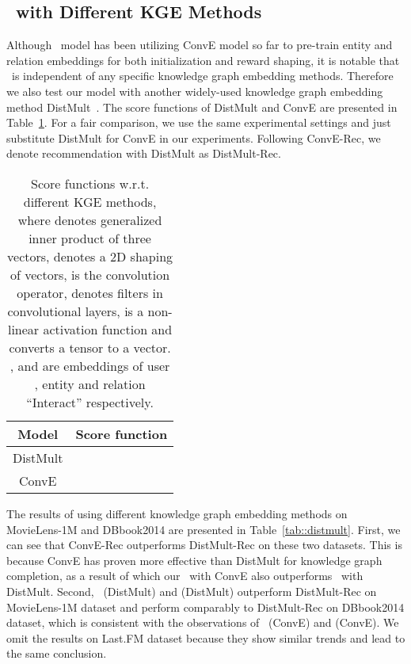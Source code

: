 \subsection{\name\ with Different KGE Methods}\label{sec::distmult}
Although \name\ model has been utilizing ConvE model so far to pre-train entity and relation embeddings for both initialization and reward shaping, it is notable that \name\ is independent of any specific knowledge graph embedding methods. 
Therefore we also test our model with another widely-used knowledge graph embedding method DistMult~\cite{yang2014embedding}. The score functions of DistMult and ConvE are presented in Table~\ref{tab::score_func}. For a fair comparison, we use the same experimental settings and just substitute DistMult for ConvE in our experiments. Following ConvE-Rec, we denote recommendation with DistMult as DistMult-Rec.



\begin{table}[t]
    \centering
    \begin{tabular}{cc}
    \toprule
        Model & Score function   \\
        \midrule
        DistMult &  \\
        ConvE &  \\
    \bottomrule
    \end{tabular}
    \caption{Score functions w.r.t. different KGE methods, where  denotes generalized inner product of three vectors,  denotes a 2D shaping of vectors,  is the convolution operator,  denotes filters in convolutional layers,  is a non-linear activation function and \cdot converts a tensor to a vector. ,  and  are embeddings of user , entity  and relation ``Interact'' respectively.}
\label{tab::score_func}
\end{table}

The results of using different knowledge graph embedding methods on MovieLens-1M and DBbook2014 are presented in Table~\ref{tab::distmult}. First, we can see that ConvE-Rec outperforms DistMult-Rec on these two datasets. This is because ConvE has proven more effective than DistMult for knowledge graph completion, as a result of which our \name\ with ConvE also outperforms \name\ with DistMult. Second, \name\ (DistMult) and \name* (DistMult) outperform DistMult-Rec on MovieLens-1M dataset and perform comparably to DistMult-Rec on DBbook2014 dataset, which is consistent with the observations of \name\ (ConvE) and \name* (ConvE). We omit the results on Last.FM dataset because they show similar trends and lead to the same conclusion.










